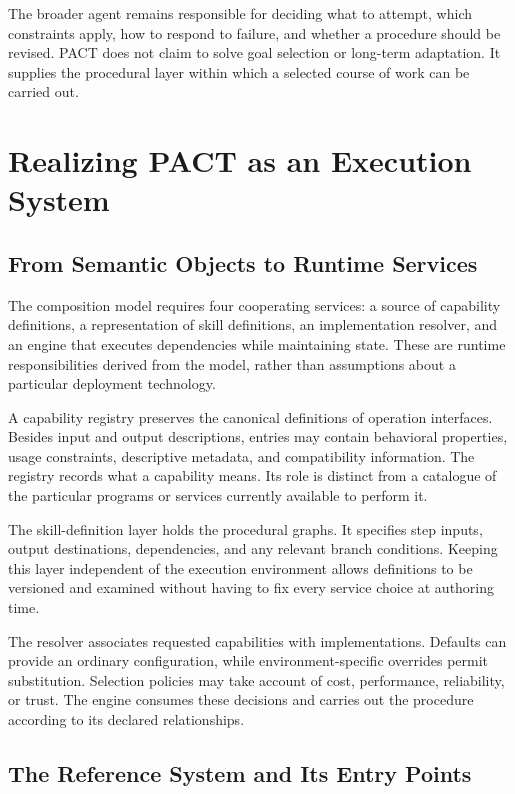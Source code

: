 \documentclass[10pt,twocolumn,a4paper]{article}
\begin{document}
The broader agent remains responsible for deciding what to attempt, which constraints apply, how to respond to failure, and whether a procedure should be revised. PACT does not claim to solve goal selection or long-term adaptation. It supplies the procedural layer within which a selected course of work can be carried out.


\section{Realizing PACT as an Execution System}

\subsection{From Semantic Objects to Runtime Services}

The composition model requires four cooperating services: a source of capability definitions, a representation of skill definitions, an implementation resolver, and an engine that executes dependencies while maintaining state. These are runtime responsibilities derived from the model, rather than assumptions about a particular deployment technology.


A capability registry preserves the canonical definitions of operation interfaces. Besides input and output descriptions, entries may contain behavioral properties, usage constraints, descriptive metadata, and compatibility information. The registry records what a capability means. Its role is distinct from a catalogue of the particular programs or services currently available to perform it.


The skill-definition layer holds the procedural graphs. It specifies step inputs, output destinations, dependencies, and any relevant branch conditions. Keeping this layer independent of the execution environment allows definitions to be versioned and examined without having to fix every service choice at authoring time.


The resolver associates requested capabilities with implementations. Defaults can provide an ordinary configuration, while environment-specific overrides permit substitution. Selection policies may take account of cost, performance, reliability, or trust. The engine consumes these decisions and carries out the procedure according to its declared relationships.


\subsection{The Reference System and Its Entry Points}
\end{document}
